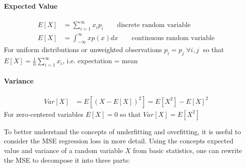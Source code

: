 \begin{advanced}
\begin{infobox}
\paragraph*{Expected Value} 
\begin{align*}
E[X] &= \sum_{i=1}^{\infty} x_i p_i \qquad \text{discrete random variable}\\
E[X] &= \int_{-\infty}^{\infty} x p(x) dx \qquad \text{continuous random variable}
\end{align*}
For uniform distributions or unweighted observations $p_i=p_j \; \forall i, j \; $ so that $E[X] = \frac{1}{n} \sum_{i=1}^{\infty} x_i $, i.e. expectation = mean
\end{infobox}

\begin{infobox}
\paragraph*{Variance} 
\begin{align*}
Var[X] &= E[(X - E[X])^2] = E[X^2] - E[X]^2 
\end{align*}
For zero-centered variables $E[X] = 0$ so that $Var[X] = E[X^2]$
\end{infobox}

To better understand the concepts of underfitting and overfitting, it is useful to consider the MSE regression loss in more detail. Using the concepts expected value and variance of a random variable $X$ from basic statistics, one can rewrite the MSE to decompose it into three parts:


\end{advanced}
